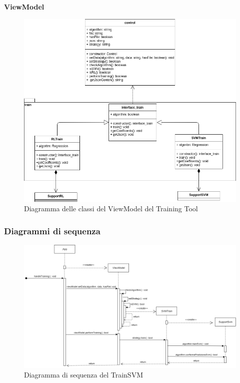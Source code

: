\textbf{ViewModel}
\begin{figure}[H]
\centering
\includegraphics[scale=0.5]{../../Diagrams/Classes_diagrams/tool_modelview.png}
\caption{Diagramma delle classi del ViewModel del Training Tool}
\end{figure}


\subsubsection{Diagrammi di sequenza}
\begin{figure}[H]
\centering
\includegraphics[scale=0.45]{../../Diagrams/Sequence_diagrams/trainSVM.png}
\caption{Diagramma di sequenza del TrainSVM}
\end{figure}

